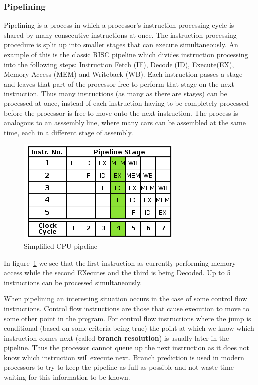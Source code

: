 \documentclass[english,a4paper]{article}
\begin{document}
\subsubsection{Pipelining}

Pipelining is a process in which a processor's instruction processing
cycle is shared by many consecutive instructions at once. The
instruction processing procedure is split up into smaller stages that
can execute simultaneously. An example of this is the classic RISC
pipeline which divides instruction processing into the following
steps: Instruction Fetch (IF), Decode (ID), Execute(EX), Memory Access
(MEM) and Writeback (WB). Each instruction passes a stage and leaves
that part of the processor free to perform that stage on the next
instruction. Thus many instructions (as many as there are stages) can
be processed at once, instead of each instruction having to be
completely processed before the processor is free to move onto the
next instruction. The process is analogous to an asssembly line, where
many cars can be assembled at the same time, each in a different stage
of assembly.

\begin{figure}[tph]
  \centering
  \includegraphics[scale=0.5]{pipeline}
  \caption{Simplified CPU pipeline}
  \label{fig:pipeline}
\end{figure}

In figure~\ref{fig:pipeline} we see that the first instruction as
currently performing memory access while the second EXecutes and the
third is being Decoded. Up to 5 instructions can be processed
simultaneously.

When pipelining an interesting situation occurs in the case of some
control flow instructions. Control flow instructions are those that
cause execution to move to some other point in the program. For
control flow instructions where the jump is conditional (based on some
criteria being true) the point at which we know which instruction
comes next (called \textbf{branch resolution}) is usually later in the
pipeline. Thus the processor cannot queue up the next instruction as
it does not know which instruction will execute next. Branch
prediction is used in modern processors to try to keep the pipeline as
full as possible and not waste time waiting for this information to be
known.
\end{document}
